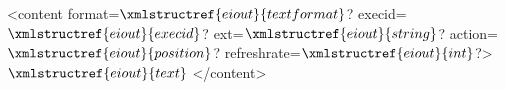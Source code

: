 <content format=$\xmlstructref{eiout}{textformat}$? execid=$\xmlstructref{eiout}{execid}$? ext=$\xmlstructref{eiout}{string}$? 
         action=$\xmlstructref{eiout}{position}$? refreshrate=$\xmlstructref{eiout}{int}$?>
  $\xmlstructref{eiout}{text}$
</content>
